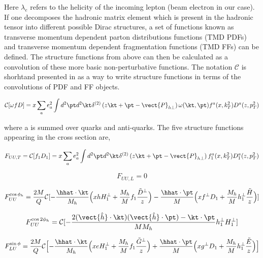 Here $\lambda_e$ refers to the helicity of the incoming lepton (beam electron in our case).  If one decomposes the hadronic matrix element which is present in the hadronic tensor into different possible Dirac structures, a set of functions known as transverse momentum dependent parton distributions functions (TMD PDFs) and transverse momentum dependent fragmentation functions (TMD FFs) can be defined.  The structure functions from above can then be calculated as a convolution of these more basic non-perturbative functions.  The notation $\mathcal{C}$ is shorhtand  presented in \cite{tmds-bacchetta:2006} as a way to write structure functions in terms of the convolutions of PDF and FF objects.

\begin{equation}
  \mathcal{C}[\omega f D] = x \sum_{a} e^{2}_{a} \int d^{2}\pt d^{2}\kt \delta^{(2)} \left( z\kt + \pt - \vect{P}_{h\perp} \right) \omega (\kt, \pt) f^{a}(x, k_{T}^{2}) D^{a}(z, p_{T}^{2}) 
\end{equation}

where a is summed over quarks and anti-quarks.  The five structure functions appearing in the cross section are, 

\begin{equation}
F_{UU,T} = \mathcal{C}[f_1 D_1] = x \sum_{a} e^{2}_{a} \int d^{2} \pt d^{2} \kt \delta^{(2)} \left( z\kt + \pt - \vect{P}_{h\perp} \right) f_{1}^{a}(x, k_{T}^{2}) D_{1}^{a}(z, p_{T}^{2})
\end{equation}

\begin{equation}
F_{UU,L} = 0
\end{equation}

\begin{equation}
F_{UU}^{\cos \phi_h} = \frac{2M}{Q} \mathcal{C}[ - \frac{\hhat \cdot \kt}{M_h} \Bigl( x h H_{1}^{\perp} + \frac{M_h}{M} f_1 \frac{\tilde{D}^{\perp}}{z} \Bigr) - \frac{\hhat \cdot \pt}{M} \Bigl( x f^{\perp} D_1 + \frac{M_h}{M} h_1^{\perp} \frac{\tilde{H}}{z} \Bigr)]
\end{equation}

\begin{equation}
F_{UU}^{\cos 2\phi_h} = \mathcal{C}[- \frac{2 (\vect{\hat{h}} \cdot \kt) (\vect{\hat{h}} \cdot \pt) - \kt \cdot \pt}{M M_h} h_{1}^{\perp} H_{1}^{\perp} ]
\end{equation}

\begin{equation}
  F_{LU}^{\sin\phi} = \frac{2M}{Q} \mathcal{C} \Bigl[ -\frac{\hhat \cdot \kt}{M_h} \Bigl( xeH_1^\perp + \frac{M_h}{M} f_1 \frac{\tilde{G}^\perp}{z} \Bigr) + \frac{\hhat \cdot \pt}{M} \Bigl( xg^\perp D_1 + \frac{M_h}{M} h_{1}^{\perp} \frac{\tilde{E}}{z} \Bigr) \Bigr]
\end{equation}

